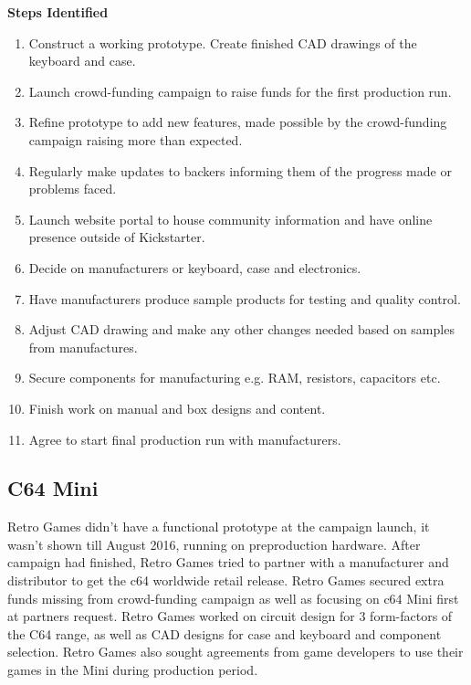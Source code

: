 \textbf{Steps Identified}\\
\begin{enumerate}
\item Construct a working prototype. Create finished CAD drawings of the keyboard and case.
\item Launch crowd-funding campaign to raise funds for the first production run.
\item Refine prototype to add new features, made possible by the crowd-funding campaign raising more than expected. 
\item Regularly make updates to backers informing them of the progress made or problems faced.
\item Launch website portal to house community information and have online presence outside of Kickstarter.
\item Decide on manufacturers or keyboard, case and electronics.
\item Have manufacturers produce sample products for testing and quality control.
\item Adjust CAD drawing and make any other changes needed based on samples from manufactures.
\item Secure components for manufacturing e.g. RAM, resistors, capacitors etc. 
\item Finish work on manual and box designs and content.
\item Agree to start final production run with manufacturers. 
\end{enumerate} 


\subsection{C64 Mini}
Retro Games didn't have a functional prototype at the campaign launch, it wasn't shown till August 2016, running on preproduction hardware. After campaign had finished, Retro Games tried to partner with a manufacturer and distributor to get the c64 worldwide retail release. Retro Games secured extra funds missing from crowd-funding campaign as well as focusing on c64 Mini first at partners request. Retro Games worked on circuit design for 3 form-factors of the C64 range, as well as CAD designs for case and keyboard and component selection. Retro Games also sought agreements from game developers to use their games in the Mini during production period. 

